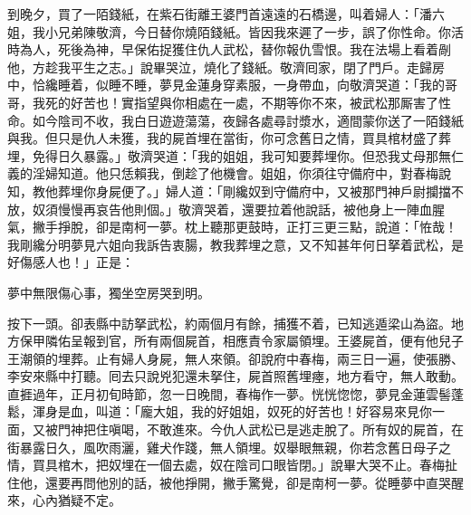 到晚夕，買了一陌錢紙，在紫石街離王婆門首遠遠的石橋邊，叫着婦人：「潘六姐，我小兄弟陳敬濟，今日替你燒陌錢紙。皆因我來遲了一步，誤了你性命。你活時為人，死後為神，早保佑捉獲住仇人武松，替你報仇雪恨。我在法場上看着剮他，方趁我平生之志。」說畢哭泣，燒化了錢紙。敬濟囘家，閉了門戶。走歸房中，恰纔睡着，似睡不睡，夢見金蓮身穿素服，一身帶血，向敬濟哭道：「我的哥哥，我死的好苦也！實指望與你相處在一處，不期等你不來，被武松那厮害了性命。如今陰司不收，我白日遊遊蕩蕩，夜歸各處尋討漿水，適間蒙你送了一陌錢紙與我。但只是仇人未獲，我的屍首埋在當街，你可念舊日之情，買具棺材盛了葬埋，免得日久暴露。」敬濟哭道：「我的姐姐，我可知要葬埋你。但恐我丈母那無仁義的淫婦知道。他只恁賴我，倒趁了他機會。姐姐，你須往守備府中，對春梅說知，教他葬埋你身屍便了。」婦人道：「剛纔奴到守備府中，又被那門神戶尉攔擋不放，奴須慢慢再哀告他則個。」敬濟哭着，還要拉着他說話，被他身上一陣血腥氣，撇手掙脫，卻是南柯一夢。枕上聽那更鼓時，正打三更三點，說道：「恠哉！我剛纔分明夢見六姐向我訴告衷腸，教我葬埋之意，又不知甚年何日拏着武松，是好傷感人也！」正是：

\begin{myquote}
夢中無限傷心事，獨坐空房哭到明。
\end{myquote}

按下一頭。卻表縣中訪拏武松，約兩個月有餘，捕獲不着，已知逃遁梁山為盜。地方保甲隣佑呈報到官，所有兩個屍首，相應責令家屬領埋。王婆屍首，便有他兒子王潮領的埋葬。止有婦人身屍，無人來領。卻說府中春梅，兩三日一遍，使張勝、李安來縣中打聽。囘去只說兇犯還未拏住，屍首照舊埋瘞，地方看守，無人敢動。直捱過年，正月初旬時節，忽一日晚間，春梅作一夢。恍恍惚惚，夢見金蓮雲髻蓬鬆，渾身是血，叫道：「龐大姐，我的好姐姐，奴死的好苦也！好容易來見你一面，又被門神把住嗔喝，不敢進來。今仇人武松已是逃走脫了。所有奴的屍首，在街暴露日久，風吹雨灑，雞犬作踐，無人領埋。奴舉眼無親，你若念舊日母子之情，買具棺木，把奴埋在一個去處，奴在陰司口眼皆閉。」{}說畢大哭不止。春梅扯住他，還要再問他別的話，被他掙開，撇手驚覺，卻是南柯一夢。從睡夢中直哭醒來，心內猶疑不定。

